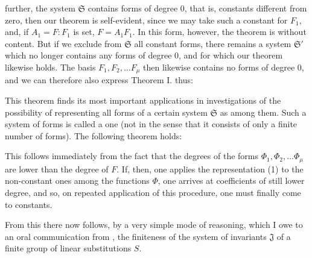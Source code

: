 further, the system $\mathfrak{S}$ contains forms of degree 0, that is, constants different from zero, then our theorem is self-evident, since we may take such a constant for $F_1$, and, if $A_1 = F : F_1$ is set, $F = A_1F_1$. In this form, however, the theorem is without content. But if we exclude from $\mathfrak{S}$ all constant forms, there remains a system $\mathfrak{S}'$ which no longer contains any forms of degree 0, and for which our theorem likewise holds. The basis $F_1, F_2, \ldots F_\mu$ then likewise contains no forms of degree 0, and we can therefore also express Theorem I. thus:


This theorem finds its most important applications in investigations of the possibility of representing all forms of a certain system $\mathfrak{S}$ as  among them. Such a system of forms is called a  one (not in the sense that it consists of only a finite number of forms). The following theorem holds:


This follows immediately from the fact that the degrees of the forms $\Phi_1, \Phi_2, \ldots \Phi_\mu$ are lower than the degree of $F$. If, then, one applies the representation (1) to the non-constant ones among the functions $\Phi$, one arrives at coefficients of still lower degree, and so, on repeated application of this procedure, one must finally come to constants.

From this there now follows, by a very simple mode of reasoning, which I owe to an oral communication from , the finiteness of the system of invariants $\mathfrak{J}$ of a finite group of linear substitutions $S$.
